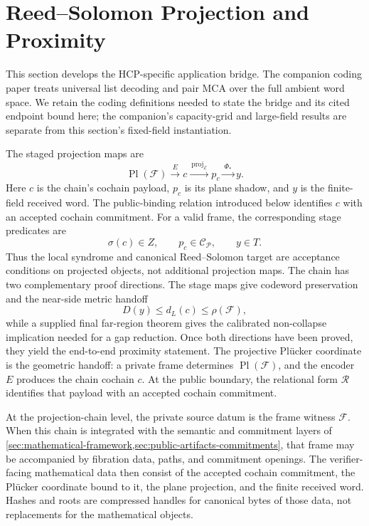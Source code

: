\section{Reed--Solomon Projection and Proximity}\label{sec:rs-proximity-projection}

This section develops the HCP-specific application bridge. The companion
coding paper \cite{vanDerVlugt2026proximity} treats universal list decoding
and pair MCA over the full ambient word space. We retain the coding
definitions needed to state the bridge and its cited endpoint bound here;
the companion's capacity-grid and large-field results are separate from this
section's fixed-field instantiation.

The staged projection maps are
\[
  \operatorname{Pl}(\mathcal F)
  \xrightarrow{\ E\ }
  c
  \xrightarrow{\ \operatorname{proj}_{\mathcal E}\ }
  p_c
  \xrightarrow{\ \Phi_\ast\ }
  y.
\]
Here \(c\) is the chain's cochain payload, \(p_c\) is its plane shadow, and
\(y\) is the finite-field received word. The public-binding relation introduced
below identifies \(c\) with an accepted cochain commitment.
For a valid frame, the corresponding stage predicates are
\[
  \sigma(c)\in Z,
  \qquad
  p_c\in\mathcal C_{\mathcal P},
  \qquad
  y\in T.
\]
Thus the local syndrome and canonical Reed--Solomon target are acceptance
conditions on projected objects, not additional projection maps. The chain has
two complementary proof directions. The stage maps give codeword preservation
and the near-side metric handoff
\[
  D(y)\le d_L(c)\le \rho(\mathcal F),
\]
while a supplied final far-region theorem gives the calibrated non-collapse
implication needed for a gap reduction. Once both directions have been proved,
they yield the end-to-end proximity statement. The projective Pl\"ucker
coordinate is the geometric handoff: a private frame determines
\(\operatorname{Pl}(\mathcal F)\), and the encoder \(E\) produces the chain
cochain \(c\). At the public boundary, the relational form \(\mathcal R\)
identifies that payload with an accepted cochain commitment.

At the projection-chain level, the private source datum is the frame witness
\(\mathcal F\). When this chain is integrated with the semantic and commitment
layers of \cref{sec:mathematical-framework,sec:public-artifacts-commitments}, that
frame may be accompanied by fibration data, paths, and commitment openings.
The verifier-facing mathematical data then consist of the accepted cochain
commitment, the Pl\"ucker coordinate bound to it, the plane projection, and the
finite received word. Hashes and roots are compressed handles for canonical
bytes of those data, not replacements for the mathematical objects.

